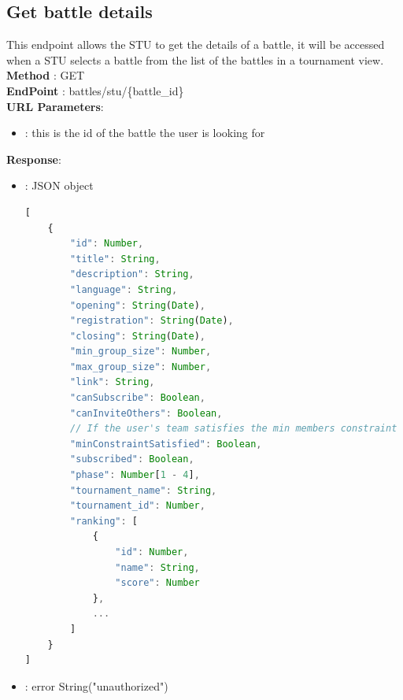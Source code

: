 \subsection*{Get battle details}
This endpoint allows the STU to get the details of a battle, it will be accessed when a STU selects a battle from the list of the battles in a tournament view.\\
\textbf{Method} : GET \\
\textbf{EndPoint} :  battles/stu/\{battle\_id\}\\
\textbf{URL Parameters}:
\begin{itemize}
    \item {} : this is the id of the battle the user is looking for
\end{itemize}
\textbf{Response}:
\begin{itemize}
    \item {} : JSON object
          \begin{lstlisting}[language=JavaScript, label={lst:jscode}, basicstyle=\ttfamily]
[
    {
        "id": Number,
        "title": String,
        "description": String,
        "language": String,
        "opening": String(Date),
        "registration": String(Date),
        "closing": String(Date),
        "min_group_size": Number,
        "max_group_size": Number,
        "link": String,
        "canSubscribe": Boolean,
        "canInviteOthers": Boolean,
        // If the user's team satisfies the min members constraint
        "minConstraintSatisfied": Boolean,
        "subscribed": Boolean,
        "phase": Number[1 - 4],
        "tournament_name": String,
        "tournament_id": Number,
        "ranking": [
            {
                "id": Number,
                "name": String,
                "score": Number
            },
            ...
        ]
    }
]
        \end{lstlisting}
    \item {} : error String("unauthorized")
\end{itemize}


